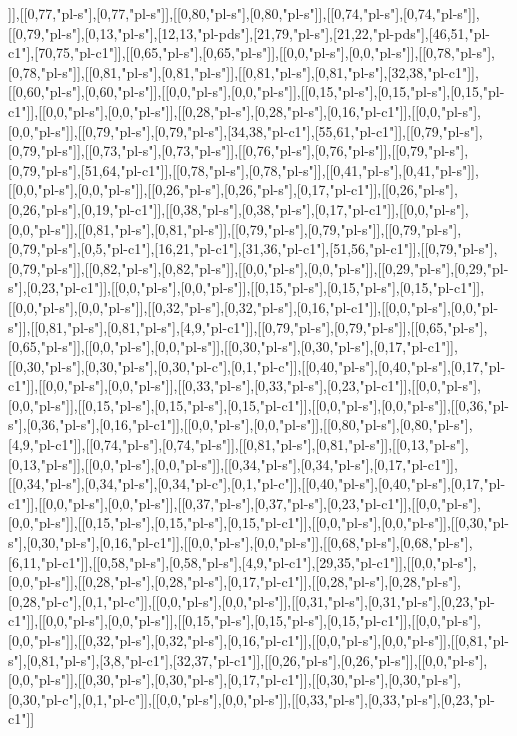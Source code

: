 ]],[[0,77,"pl-s"],[0,77,"pl-s"]],[[0,80,"pl-s"],[0,80,"pl-s"]],[[0,74,"pl-s"],[0,74,"pl-s"]],[[0,79,"pl-s"],[0,13,"pl-s"],[12,13,"pl-pds"],[21,79,"pl-s"],[21,22,"pl-pds"],[46,51,"pl-c1"],[70,75,"pl-c1"]],[[0,65,"pl-s"],[0,65,"pl-s"]],[[0,0,"pl-s"],[0,0,"pl-s"]],[[0,78,"pl-s"],[0,78,"pl-s"]],[[0,81,"pl-s"],[0,81,"pl-s"]],[[0,81,"pl-s"],[0,81,"pl-s"],[32,38,"pl-c1"]],[[0,60,"pl-s"],[0,60,"pl-s"]],[[0,0,"pl-s"],[0,0,"pl-s"]],[[0,15,"pl-s"],[0,15,"pl-s"],[0,15,"pl-c1"]],[[0,0,"pl-s"],[0,0,"pl-s"]],[[0,28,"pl-s"],[0,28,"pl-s"],[0,16,"pl-c1"]],[[0,0,"pl-s"],[0,0,"pl-s"]],[[0,79,"pl-s"],[0,79,"pl-s"],[34,38,"pl-c1"],[55,61,"pl-c1"]],[[0,79,"pl-s"],[0,79,"pl-s"]],[[0,73,"pl-s"],[0,73,"pl-s"]],[[0,76,"pl-s"],[0,76,"pl-s"]],[[0,79,"pl-s"],[0,79,"pl-s"],[51,64,"pl-c1"]],[[0,78,"pl-s"],[0,78,"pl-s"]],[[0,41,"pl-s"],[0,41,"pl-s"]],[[0,0,"pl-s"],[0,0,"pl-s"]],[[0,26,"pl-s"],[0,26,"pl-s"],[0,17,"pl-c1"]],[[0,26,"pl-s"],[0,26,"pl-s"],[0,19,"pl-c1"]],[[0,38,"pl-s"],[0,38,"pl-s"],[0,17,"pl-c1"]],[[0,0,"pl-s"],[0,0,"pl-s"]],[[0,81,"pl-s"],[0,81,"pl-s"]],[[0,79,"pl-s"],[0,79,"pl-s"]],[[0,79,"pl-s"],[0,79,"pl-s"],[0,5,"pl-c1"],[16,21,"pl-c1"],[31,36,"pl-c1"],[51,56,"pl-c1"]],[[0,79,"pl-s"],[0,79,"pl-s"]],[[0,82,"pl-s"],[0,82,"pl-s"]],[[0,0,"pl-s"],[0,0,"pl-s"]],[[0,29,"pl-s"],[0,29,"pl-s"],[0,23,"pl-c1"]],[[0,0,"pl-s"],[0,0,"pl-s"]],[[0,15,"pl-s"],[0,15,"pl-s"],[0,15,"pl-c1"]],[[0,0,"pl-s"],[0,0,"pl-s"]],[[0,32,"pl-s"],[0,32,"pl-s"],[0,16,"pl-c1"]],[[0,0,"pl-s"],[0,0,"pl-s"]],[[0,81,"pl-s"],[0,81,"pl-s"],[4,9,"pl-c1"]],[[0,79,"pl-s"],[0,79,"pl-s"]],[[0,65,"pl-s"],[0,65,"pl-s"]],[[0,0,"pl-s"],[0,0,"pl-s"]],[[0,30,"pl-s"],[0,30,"pl-s"],[0,17,"pl-c1"]],[[0,30,"pl-s"],[0,30,"pl-s"],[0,30,"pl-c"],[0,1,"pl-c"]],[[0,40,"pl-s"],[0,40,"pl-s"],[0,17,"pl-c1"]],[[0,0,"pl-s"],[0,0,"pl-s"]],[[0,33,"pl-s"],[0,33,"pl-s"],[0,23,"pl-c1"]],[[0,0,"pl-s"],[0,0,"pl-s"]],[[0,15,"pl-s"],[0,15,"pl-s"],[0,15,"pl-c1"]],[[0,0,"pl-s"],[0,0,"pl-s"]],[[0,36,"pl-s"],[0,36,"pl-s"],[0,16,"pl-c1"]],[[0,0,"pl-s"],[0,0,"pl-s"]],[[0,80,"pl-s"],[0,80,"pl-s"],[4,9,"pl-c1"]],[[0,74,"pl-s"],[0,74,"pl-s"]],[[0,81,"pl-s"],[0,81,"pl-s"]],[[0,13,"pl-s"],[0,13,"pl-s"]],[[0,0,"pl-s"],[0,0,"pl-s"]],[[0,34,"pl-s"],[0,34,"pl-s"],[0,17,"pl-c1"]],[[0,34,"pl-s"],[0,34,"pl-s"],[0,34,"pl-c"],[0,1,"pl-c"]],[[0,40,"pl-s"],[0,40,"pl-s"],[0,17,"pl-c1"]],[[0,0,"pl-s"],[0,0,"pl-s"]],[[0,37,"pl-s"],[0,37,"pl-s"],[0,23,"pl-c1"]],[[0,0,"pl-s"],[0,0,"pl-s"]],[[0,15,"pl-s"],[0,15,"pl-s"],[0,15,"pl-c1"]],[[0,0,"pl-s"],[0,0,"pl-s"]],[[0,30,"pl-s"],[0,30,"pl-s"],[0,16,"pl-c1"]],[[0,0,"pl-s"],[0,0,"pl-s"]],[[0,68,"pl-s"],[0,68,"pl-s"],[6,11,"pl-c1"]],[[0,58,"pl-s"],[0,58,"pl-s"],[4,9,"pl-c1"],[29,35,"pl-c1"]],[[0,0,"pl-s"],[0,0,"pl-s"]],[[0,28,"pl-s"],[0,28,"pl-s"],[0,17,"pl-c1"]],[[0,28,"pl-s"],[0,28,"pl-s"],[0,28,"pl-c"],[0,1,"pl-c"]],[[0,0,"pl-s"],[0,0,"pl-s"]],[[0,31,"pl-s"],[0,31,"pl-s"],[0,23,"pl-c1"]],[[0,0,"pl-s"],[0,0,"pl-s"]],[[0,15,"pl-s"],[0,15,"pl-s"],[0,15,"pl-c1"]],[[0,0,"pl-s"],[0,0,"pl-s"]],[[0,32,"pl-s"],[0,32,"pl-s"],[0,16,"pl-c1"]],[[0,0,"pl-s"],[0,0,"pl-s"]],[[0,81,"pl-s"],[0,81,"pl-s"],[3,8,"pl-c1"],[32,37,"pl-c1"]],[[0,26,"pl-s"],[0,26,"pl-s"]],[[0,0,"pl-s"],[0,0,"pl-s"]],[[0,30,"pl-s"],[0,30,"pl-s"],[0,17,"pl-c1"]],[[0,30,"pl-s"],[0,30,"pl-s"],[0,30,"pl-c"],[0,1,"pl-c"]],[[0,0,"pl-s"],[0,0,"pl-s"]],[[0,33,"pl-s"],[0,33,"pl-s"],[0,23,"pl-c1"]]